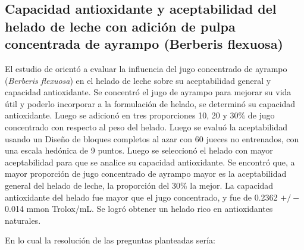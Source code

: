 \subsection{Capacidad antioxidante y aceptabilidad del helado de leche con adición de pulpa concentrada de ayrampo (Berberis flexuosa)}

El estudio de \cite{cutti2022influencia} orientó a evaluar la influencia del jugo concentrado de ayrampo (\textsl{Berberis flexuosa}) en el helado de leche sobre su aceptabilidad general y capacidad antioxidante. Se concentró el jugo de ayrampo para mejorar su vida útil y poderlo incorporar a la formulación de helado, se determinó su capacidad antioxidante. Luego se adicionó en tres proporciones 10, 20 y 30$\%$ de jugo concentrado con respecto al peso del helado. Luego se evaluó la aceptabilidad usando un Diseño de bloques completos al azar con 60 jueces no entrenados, con una escala hedónica de 9 puntos. Luego se seleccionó el helado con mayor aceptabilidad para que se analice su capacidad antioxidante. Se encontró que, a mayor proporción de jugo concentrado de ayrampo mayor es la aceptabilidad general del helado de leche, la proporción del $30\%$ la mejor. La capacidad antioxidante del helado fue mayor que el jugo concentrado, y fue de 0.2362 $+/-$ 0.014 mmon Trolox/mL. Se logró obtener un helado rico en antioxidantes naturales.

En lo cual la resolución de las preguntas planteadas sería:

